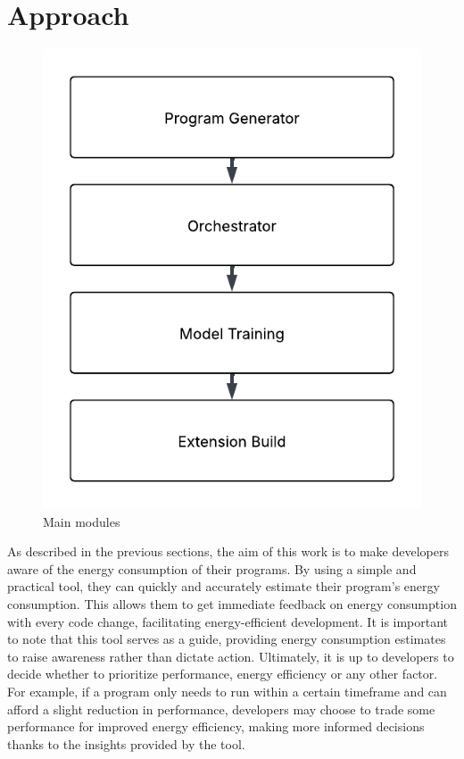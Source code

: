 \usepackage{xcolor}

\usepackage[most]{tcolorbox}
\usepackage{minted}
\usepackage{placeins}
\usepackage{float}

\chapter{Approach}\label{chapter:approach}

\begin{figure}[htbp]
  \centering
  \includegraphics[width = .8 \textwidth]{figures/main_modules.pdf}
  \caption{Main modules}
  \label{fig:main_modules}
\end{figure}
As described in the previous sections, the aim of this work is to make developers aware of the energy consumption of their programs. By using a simple and practical tool, they can quickly and accurately estimate their program's energy consumption. This allows them to get immediate feedback on energy consumption with every code change, facilitating energy-efficient development. It is important to note that this tool serves as a guide, providing energy consumption estimates to raise awareness rather than dictate action. Ultimately, it is up to developers to decide whether to prioritize performance, energy efficiency or any other factor. For example, if a program only needs to run within a certain timeframe and can afford a slight reduction in performance, developers may choose to trade some performance for improved energy efficiency, making more informed decisions thanks to the insights provided by the tool.


